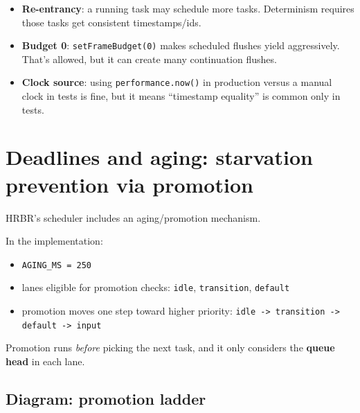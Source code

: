 \begin{itemize}
  \item \textbf{Re-entrancy}: a running task may schedule more tasks. Determinism requires those tasks get consistent timestamps/ids.
  \item \textbf{Budget 0}: \texttt{setFrameBudget(0)} makes scheduled flushes yield aggressively. That's allowed, but it can create many continuation flushes.
  \item \textbf{Clock source}: using \texttt{performance.now()} in production versus a manual clock in tests is fine, but it means ``timestamp equality'' is common only in tests.
\end{itemize}

\section{Deadlines and aging: starvation prevention via promotion}

HRBR's scheduler includes an aging/promotion mechanism.

In the implementation:

\begin{itemize}
  \item \texttt{AGING\_MS = 250}
  \item lanes eligible for promotion checks: \texttt{idle}, \texttt{transition}, \texttt{default}
  \item promotion moves one step toward higher priority:
    \texttt{idle -> transition -> default -> input}
\end{itemize}

Promotion runs \emph{before} picking the next task, and it only considers the \textbf{queue head} in each lane.

\subsection*{Diagram: promotion ladder}

\begin{center}
\end{center}

